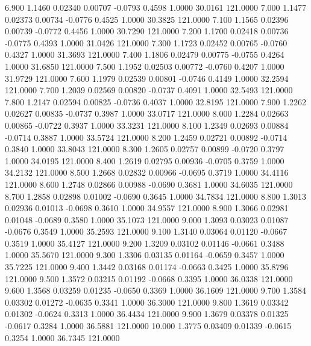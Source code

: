    6.900   1.1460   0.02340   0.00707  -0.0793   0.4598   1.0000  30.0161 121.0000
   7.000   1.1477   0.02373   0.00734  -0.0776   0.4525   1.0000  30.3825 121.0000
   7.100   1.1565   0.02396   0.00739  -0.0772   0.4456   1.0000  30.7290 121.0000
   7.200   1.1700   0.02418   0.00736  -0.0775   0.4393   1.0000  31.0426 121.0000
   7.300   1.1723   0.02452   0.00765  -0.0760   0.4327   1.0000  31.3693 121.0000
   7.400   1.1806   0.02479   0.00775  -0.0755   0.4264   1.0000  31.6850 121.0000
   7.500   1.1952   0.02503   0.00772  -0.0760   0.4207   1.0000  31.9729 121.0000
   7.600   1.1979   0.02539   0.00801  -0.0746   0.4149   1.0000  32.2594 121.0000
   7.700   1.2039   0.02569   0.00820  -0.0737   0.4091   1.0000  32.5493 121.0000
   7.800   1.2147   0.02594   0.00825  -0.0736   0.4037   1.0000  32.8195 121.0000
   7.900   1.2262   0.02627   0.00835  -0.0737   0.3987   1.0000  33.0717 121.0000
   8.000   1.2284   0.02663   0.00865  -0.0722   0.3937   1.0000  33.3231 121.0000
   8.100   1.2349   0.02693   0.00884  -0.0714   0.3887   1.0000  33.5724 121.0000
   8.200   1.2459   0.02721   0.00892  -0.0714   0.3840   1.0000  33.8043 121.0000
   8.300   1.2605   0.02757   0.00899  -0.0720   0.3797   1.0000  34.0195 121.0000
   8.400   1.2619   0.02795   0.00936  -0.0705   0.3759   1.0000  34.2132 121.0000
   8.500   1.2668   0.02832   0.00966  -0.0695   0.3719   1.0000  34.4116 121.0000
   8.600   1.2748   0.02866   0.00988  -0.0690   0.3681   1.0000  34.6035 121.0000
   8.700   1.2858   0.02898   0.01002  -0.0690   0.3645   1.0000  34.7834 121.0000
   8.800   1.3013   0.02936   0.01013  -0.0698   0.3610   1.0000  34.9557 121.0000
   8.900   1.3066   0.02981   0.01048  -0.0689   0.3580   1.0000  35.1073 121.0000
   9.000   1.3093   0.03023   0.01087  -0.0676   0.3549   1.0000  35.2593 121.0000
   9.100   1.3140   0.03064   0.01120  -0.0667   0.3519   1.0000  35.4127 121.0000
   9.200   1.3209   0.03102   0.01146  -0.0661   0.3488   1.0000  35.5670 121.0000
   9.300   1.3306   0.03135   0.01164  -0.0659   0.3457   1.0000  35.7225 121.0000
   9.400   1.3442   0.03168   0.01174  -0.0663   0.3425   1.0000  35.8796 121.0000
   9.500   1.3572   0.03215   0.01192  -0.0668   0.3395   1.0000  36.0338 121.0000
   9.600   1.3568   0.03259   0.01235  -0.0650   0.3369   1.0000  36.1609 121.0000
   9.700   1.3584   0.03302   0.01272  -0.0635   0.3341   1.0000  36.3000 121.0000
   9.800   1.3619   0.03342   0.01302  -0.0624   0.3313   1.0000  36.4434 121.0000
   9.900   1.3679   0.03378   0.01325  -0.0617   0.3284   1.0000  36.5881 121.0000
  10.000   1.3775   0.03409   0.01339  -0.0615   0.3254   1.0000  36.7345 121.0000
